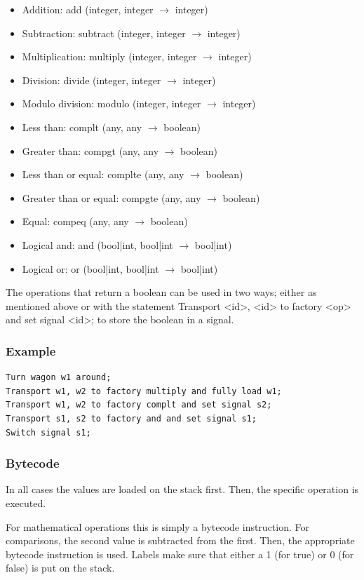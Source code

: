 \documentclass[10pt,a4paper]{article}
\newcommand{\code}[1]{{\ttfamily\small #1}}
\begin{document}
\begin{itemize}
\item Addition: \code{add} (integer, integer $\to$ integer)
\item Subtraction: \code{subtract} (integer, integer $\to$ integer)
\item Multiplication: \code{multiply} (integer, integer $\to$ integer)
\item Division: \code{divide} (integer, integer $\to$ integer)
\item Modulo division: \code{modulo} (integer, integer $\to$ integer)
\item Less than: \code{complt} (any, any $\to$ boolean)
\item Greater than: \code{compgt} (any, any $\to$ boolean)
\item Less than or equal: \code{complte} (any, any $\to$ boolean)
\item Greater than or equal: \code{compgte} (any, any $\to$ boolean)
\item Equal: \code{compeq} (any, any $\to$ boolean)
\item Logical and: \code{and} (bool|int, bool|int $\to$ bool|int)
\item Logical or: \code{or} (bool|int, bool|int $\to$ bool|int)
\end{itemize}

The operations that return a boolean can be used in two ways; either as mentioned above or with the statement \code{Transport <id>, <id> to factory <op> and set signal <id>;} to store the boolean in a signal.

\subsubsection*{Example}

\begin{lstlisting}
Turn wagon w1 around;
Transport w1, w2 to factory multiply and fully load w1;
Transport w1, w2 to factory complt and set signal s2;
Transport s1, s2 to factory and and set signal s1;
Switch signal s1;
\end{lstlisting}

\subsubsection*{Bytecode}

In all cases the values are loaded on the stack first. Then, the specific operation is executed.

For mathematical operations this is simply a bytecode instruction. For comparisons, the second value is subtracted from the first. Then, the appropriate bytecode instruction is used. Labels make sure that either a 1 (for true) or 0 (for false) is put on the stack.
\end{document}
